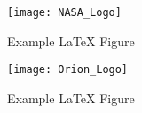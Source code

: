 \begin{minipage}[c]{0.5\textwidth}
   \begin{figure}[H]
      \centering
      \texttt{[image: NASA\_Logo]}
      \caption{Example LaTeX Figure} 
      \label{fig:NASA_Logo}
   \end{figure}
\end{minipage}%
\begin{minipage}[c]{0.5\textwidth}
   \begin{figure}[H]
      \centering
      \texttt{[image: Orion\_Logo]}
      \caption{Example LaTeX Figure} 
      \label{fig:Orion_Logo}
   \end{figure}
\end{minipage}